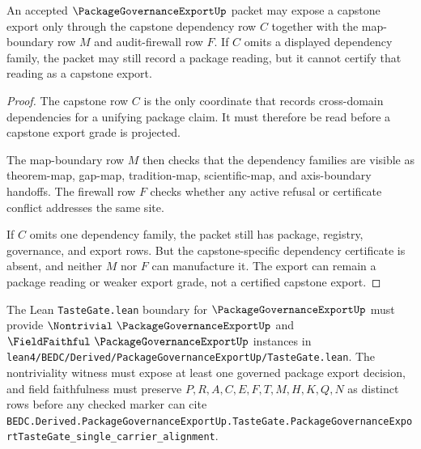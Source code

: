 \begin{theorem}
\label{thm:package-governance-export-capstone-dependency-exactness}
An accepted $\PackageGovernanceExportUp$ packet may expose a capstone export only through the capstone dependency row $C$ together with the map-boundary row $M$ and audit-firewall row $F$. If $C$ omits a displayed dependency family, the packet may still record a package reading, but it cannot certify that reading as a capstone export.
\end{theorem}
\begin{proof}
The capstone row $C$ is the only coordinate that records cross-domain dependencies for a unifying package claim. It must therefore be read before a capstone export grade is projected.

The map-boundary row $M$ then checks that the dependency families are visible as theorem-map, gap-map, tradition-map, scientific-map, and axis-boundary handoffs. The firewall row $F$ checks whether any active refusal or certificate conflict addresses the same site.

If $C$ omits one dependency family, the packet still has package, registry, governance, and export rows. But the capstone-specific dependency certificate is absent, and neither $M$ nor $F$ can manufacture it. The export can remain a package reading or weaker export grade, not a certified capstone export.
\end{proof}



The Lean \texttt{TasteGate.lean} boundary for $\PackageGovernanceExportUp$ must provide $\Nontrivial\ \PackageGovernanceExportUp$ and $\FieldFaithful\ \PackageGovernanceExportUp$ instances in \texttt{lean4/BEDC/Derived/PackageGovernanceExportUp/TasteGate.lean}. The nontriviality witness must expose at least one governed package export decision, and field faithfulness must preserve $P,R,A,C,E,F,T,M,H,K,Q,N$ as distinct rows before any checked marker can cite \texttt{BEDC.Derived.PackageGovernanceExportUp.TasteGate.PackageGovernanceExportTasteGate\_single\_carrier\_alignment}.

